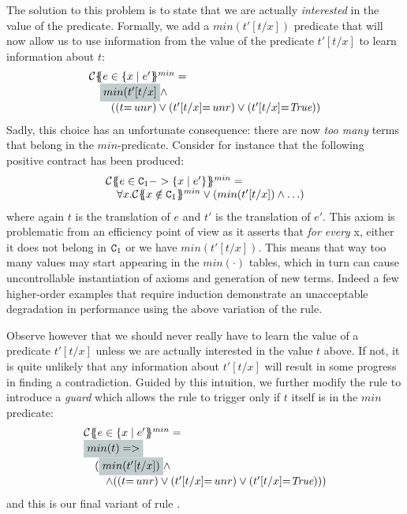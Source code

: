 The solution to this problem is to state that we are actually {\em interested} in the value of the predicate. Formally, 
we add a $min(t'[t/x])$ predicate that will now allow us to use information from the value of the predicate $t'[t/x]$ 
to learn information about $t$:
\[\begin{array}{l}    \ctransmin{}{\Gamma}{e \in \{ x \mid e' } = \\ 
   \quad \highlight{min(t'[t/x]} \land \\ 
   \quad \quad ((t{=}\unr) \lor (t'[t/x]{=}\unr) \lor (t'[t/x]{=}\True))
\end{array}\]
Sadly, this choice has an unfortunate consequence: there are now {\em too many} terms that belong in 
the $min$-predicate. Consider for instance that the following positive contract has been produced:
\[\begin{array}{l}
    \ctransmin{}{\Gamma}{e \in \Ct_1 -> \{x \mid e'\}} = \\ 
        \quad \forall x. \ctransmin{}{\Gamma}{x \notin \Ct_1} \lor (min(t'[t/x]) \land \ldots )
\end{array}\] 
where again $t$ is the translation of $e$ and $t'$ is the translation of $e'$. This axiom is problematic
from an efficiency point of view as it asserts that {\em for every} x, either it does not belong in ${\tt C}_1$
or we have $min(t'[t/x])$. This means that way too many values may start appearing in the $min(\cdot)$ tables,
which in turn can cause uncontrollable instantiation of axioms and generation of new terms. 
Indeed a few higher-order examples that require induction demonstrate an unacceptable
degradation in performance using the above variation of the rule. 

Observe however that we should never really have to learn the value of a predicate $t'[t/x]$ unless we 
are actually interested in the value $t$ above. If not, it is quite unlikely that any information about
$t'[t/x]$ will result in some progress in finding a contradiction. Guided by this intuition, we further modify 
the rule  to introduce a {\em guard} which allows the rule to trigger only if $t$ itself is
in the $min$ predicate: 
\[\begin{array}{l}
    \ctransmin{}{\Gamma}{e \in \{ x \mid e' } = \\ 
    \highlight{min(t) => } \\ 
    \quad (\highlight{min(t'[t/x])} \land \\ 
    \quad\quad \land ((t{=}\unr) \lor (t'[t/x]{=}\unr) \lor (t'[t/x]{=}\True)))
\end{array} \]
and this is our final variant of rule .

